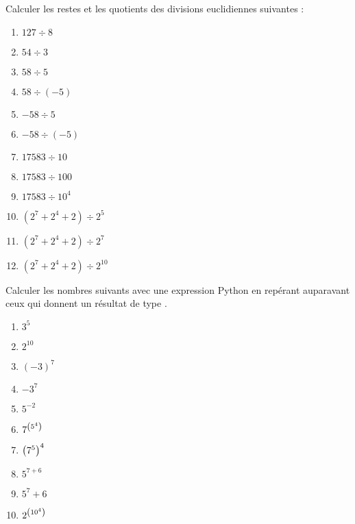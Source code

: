 Calculer les restes et les quotients des divisions euclidiennes suivantes : 
\begin{multicols}{2}
  \begin{enumerate}[label=\emph{\alph*)}]
    \item $127 \div 8$
    \item $54 \div 3$
    \item $58 \div 5$
    \item $58 \div (-5)$
    \item $-58 \div 5$
    \item $-58 \div (-5)$
    \item $17583 \div 10$
    \item $17583 \div 100$
    \item $17583 \div 10^4$
    \item $(2^7+2^4+2) \div 2^5$
    \item $(2^7+2^4+2) \div 2^7$
    \item $(2^7+2^4+2) \div 2^{10}$
  \end{enumerate}
\end{multicols}
Calculer les nombres suivants avec une expression Python en repérant auparavant ceux qui donnent un résultat de type .
\begin{multicols}{2}
  \begin{enumerate}[label=\emph{\alph*)}]
    \item $3^5$
    \item $2^{10}$
    \item $(-3)^7$
    \item $-3^7$
    \item $5^{-2}$
    \item $7^{\left(5^4\right)}$
    \item $\left(7^5\right)^4$
    \item $5^{7+6}$
    \item $5^7+6$
    \item $2^{\left(10^4\right)}$
  \end{enumerate}
\end{multicols}

